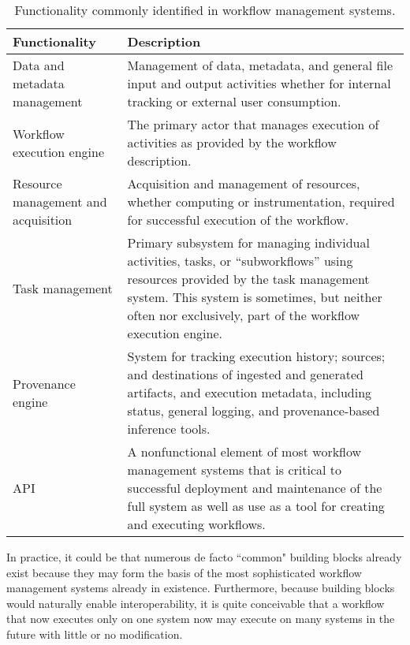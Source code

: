 \begin{table*}[h]
\begin{tabu} to \textwidth {|X[l]|X[l]|} \hline
\textbf{Functionality} & \textbf{Description} \tabularnewline\hline Data and
metadata management & Management of data, metadata, and general file input and
output activities whether for internal tracking or external user
consumption. \\ \hline 
Workflow execution engine & The primary
actor that manages execution of activities as provided by the workflow
description. \tabularnewline\hline 
Resource management and acquisition &
Acquisition and management of resources, whether computing or instrumentation,
required for successful execution of the workflow. \tabularnewline\hline
Task management & Primary subsystem for managing individual activities, tasks,
or ``subworkflows'' using resources provided by the task management system. This
system is sometimes, but neither often nor exclusively, part of the workflow
execution engine. \tabularnewline\hline 
Provenance engine & System for tracking
execution history; sources; and destinations of ingested and generated
artifacts, and execution metadata, including status, general logging, and
provenance-based inference tools. \tabularnewline\hline 
API &
A nonfunctional element of most workflow management systems that is critical to
successful deployment and maintenance of the full system as well as use
as a tool for creating and executing workflows. \tabularnewline\hline
\end{tabu} 
\caption{Functionality commonly identified in workflow management
systems.} 
\label{blocks}
\end{table*}

In practice, it could be that numerous de facto ``common" building blocks
already exist because they may form the basis of the most sophisticated
workflow management systems already in existence. Furthermore, because building
blocks would naturally enable interoperability, it is quite conceivable that a
workflow that now executes only on one system now may execute on many systems in
the future with little or no modification.

